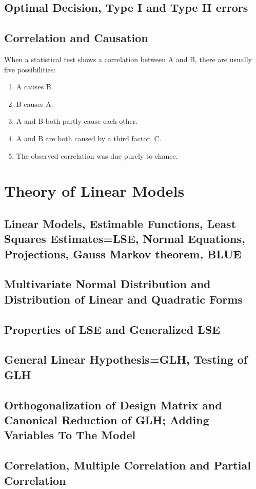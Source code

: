 \documentclass{memoir}
\begin{document}
\section{Optimal Decision, Type I and Type II errors}
\section{Correlation and Causation}
When a statistical test shows a correlation between A and B, there are usually five possibilities:
\begin{enumerate}
\item A causes B.
\item B causes A.
\item A and B both partly cause each other.
\item A and B are both caused by a third factor, C.
\item The observed correlation was due purely to chance.
\end{enumerate}

\chapter{Theory of Linear Models}
\section{Linear Models, Estimable Functions, Least Squares Estimates=LSE, Normal Equations, Projections, Gauss Markov theorem, BLUE}
\section{Multivariate Normal Distribution and Distribution of Linear and Quadratic Forms}
\section{Properties of LSE and Generalized LSE}
\section{General Linear Hypothesis=GLH, Testing of GLH}
\section{Orthogonalization of Design Matrix and Canonical Reduction of GLH;  Adding Variables To The Model}
\section{Correlation, Multiple Correlation and  Partial Correlation}
\end{document}
